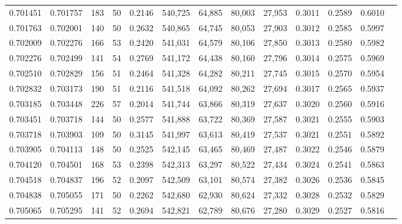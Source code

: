 \begin{tabular}{rrrrrrrrrrrrr}
0.701451 & 0.701757 &   183 &  50 &                                     0.2146 & 540,725 &  64,885 &  80,003 &  27,953 & 0.3011 & 0.2589 & 0.6010 \\
0.701763 & 0.702001 &   140 &  50 &                                     0.2632 & 540,865 &  64,745 &  80,053 &  27,903 & 0.3012 & 0.2585 & 0.5997 \\
0.702009 & 0.702276 &   166 &  53 &                                     0.2420 & 541,031 &  64,579 &  80,106 &  27,850 & 0.3013 & 0.2580 & 0.5982 \\
0.702276 & 0.702499 &   141 &  54 &                                     0.2769 & 541,172 &  64,438 &  80,160 &  27,796 & 0.3014 & 0.2575 & 0.5969 \\
0.702510 & 0.702829 &   156 &  51 &                                     0.2464 & 541,328 &  64,282 &  80,211 &  27,745 & 0.3015 & 0.2570 & 0.5954 \\
0.702832 & 0.703173 &   190 &  51 &                                     0.2116 & 541,518 &  64,092 &  80,262 &  27,694 & 0.3017 & 0.2565 & 0.5937 \\
0.703185 & 0.703448 &   226 &  57 &                                     0.2014 & 541,744 &  63,866 &  80,319 &  27,637 & 0.3020 & 0.2560 & 0.5916 \\
0.703451 & 0.703718 &   144 &  50 &                                     0.2577 & 541,888 &  63,722 &  80,369 &  27,587 & 0.3021 & 0.2555 & 0.5903 \\
0.703718 & 0.703903 &   109 &  50 &                                     0.3145 & 541,997 &  63,613 &  80,419 &  27,537 & 0.3021 & 0.2551 & 0.5892 \\
0.703905 & 0.704113 &   148 &  50 &                                     0.2525 & 542,145 &  63,465 &  80,469 &  27,487 & 0.3022 & 0.2546 & 0.5879 \\
0.704120 & 0.704501 &   168 &  53 &                                     0.2398 & 542,313 &  63,297 &  80,522 &  27,434 & 0.3024 & 0.2541 & 0.5863 \\
0.704518 & 0.704837 &   196 &  52 &                                     0.2097 & 542,509 &  63,101 &  80,574 &  27,382 & 0.3026 & 0.2536 & 0.5845 \\
0.704838 & 0.705055 &   171 &  50 &                                     0.2262 & 542,680 &  62,930 &  80,624 &  27,332 & 0.3028 & 0.2532 & 0.5829 \\
0.705065 & 0.705295 &   141 &  52 &                                     0.2694 & 542,821 &  62,789 &  80,676 &  27,280 & 0.3029 & 0.2527 & 0.5816 \\

\end{tabular}
